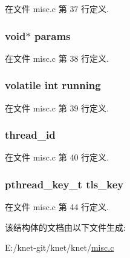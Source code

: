 在文件 misc.\+c 第 37 行定义.

\hypertarget{struct__thread__runner__t_a2aec9f694830e518722ab4bc4e275527}{}
\subsubsection[{params}]{\setlength{\rightskip}{0pt plus 5cm}void$\ast$ params}\label{struct__thread__runner__t_a2aec9f694830e518722ab4bc4e275527}


在文件 misc.\+c 第 38 行定义.

\hypertarget{struct__thread__runner__t_af1f449cc09f8d36befcce07bc38c29c0}{}
\subsubsection[{running}]{\setlength{\rightskip}{0pt plus 5cm}volatile int running}\label{struct__thread__runner__t_af1f449cc09f8d36befcce07bc38c29c0}


在文件 misc.\+c 第 39 行定义.

\hypertarget{struct__thread__runner__t_a14d64ca2cf0317cc7821972647eb7b7a}{}
\subsubsection[{thread\+\_\+id}]{ thread\+\_\+id}\label{struct__thread__runner__t_a14d64ca2cf0317cc7821972647eb7b7a}


在文件 misc.\+c 第 40 行定义.

\hypertarget{struct__thread__runner__t_a2ea447b43466d6b07a2b6af1b41a90fa}{}
\subsubsection[{tls\+\_\+key}]{\setlength{\rightskip}{0pt plus 5cm}pthread\+\_\+key\+\_\+t tls\+\_\+key}\label{struct__thread__runner__t_a2ea447b43466d6b07a2b6af1b41a90fa}


在文件 misc.\+c 第 44 行定义.



该结构体的文档由以下文件生成\+:\begin{DoxyCompactItemize}
\item 
E\+:/knet-\/git/knet/knet/\hyperlink{misc_8c}{misc.\+c}\end{DoxyCompactItemize}
